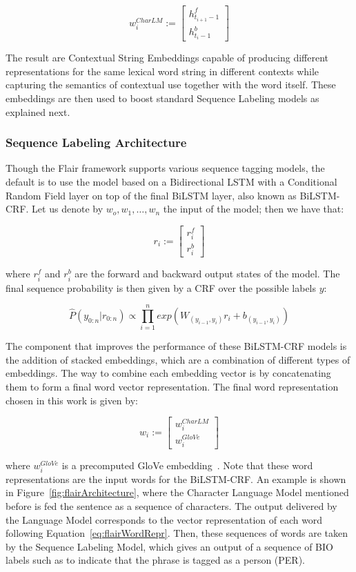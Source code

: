 \[
    w_i^{CharLM} := \begin{bmatrix} h_{t_{i+1}-1}^f \\ h_{t_{i}-1}^b \end{bmatrix}
\]

The result are Contextual String Embeddings capable of producing different representations for 
the same lexical word string in different contexts while capturing the semantics of contextual 
use together with the word itself. These embeddings are then used to boost standard Sequence 
Labeling models as explained next.

\subsubsection{Sequence Labeling Architecture}
\label{cap2:theoFrame/infExtr/sequenceLabeling/architecture}
Though the Flair framework supports various sequence tagging models, the default is to use the 
model based on a Bidirectional LSTM with a Conditional Random Field layer on top of the final 
BiLSTM layer, also known as BiLSTM-CRF\cite{seqlab:HuangXY15}. Let us denote by $w_o,w_1,\ldots,w_n$ 
the input of the model; then we have that:

\[
    r_i := \begin{bmatrix} r_i^f \\ r_i^b \end{bmatrix}
\]

where $r_i^f$ and $r_i^b$ are the forward and backward output states of the model. The final 
sequence probability is then given by a CRF over the possible labels $y$:

\[
    \widehat{P}(y_{0:n}|r_{0:n})\propto \prod_{i=1}^n exp(W_{(y_{i-1},y_i)} r_i +b_{(y_{i-1},y_i)})
\]

The component that improves the performance of these BiLSTM-CRF models is the addition of 
stacked embeddings, which are a combination of different types of embeddings. The way to combine 
each embedding vector is by concatenating them to form a final word vector representation. The 
final word representation chosen in this work is given by:

\begin{equation} \label{eq:flairWordRepr}
    w_i := \begin{bmatrix} w_i^{CharLM} \\ w_i^{GloVe} \end{bmatrix}
\end{equation}

where $w_i^{GloVe}$ is a precomputed GloVe embedding~\cite{seqlab:PenningtonSM14}. Note that 
these word representations are the input words for the BiLSTM-CRF. An example is shown in 
Figure~\ref{fig:flairArchitecture}, where the Character Language Model mentioned before is fed 
the sentence  as a sequence of characters. The output 
delivered by the Language Model corresponds to the vector representation of each word following 
Equation~\ref{eq:flairWordRepr}. Then, these sequences of words are taken by the Sequence 
Labeling Model, which gives an output of a sequence of BIO labels such as to indicate that 
the phrase  is tagged as a person (PER).


